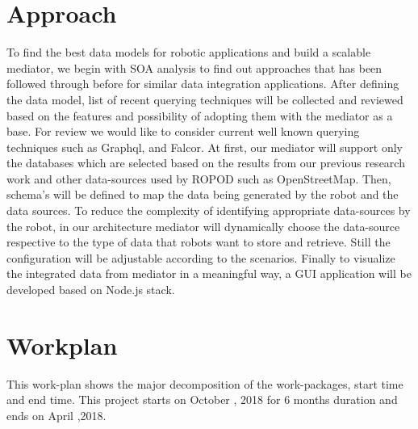 \documentclass[12pt]{article}
\begin{document}

\section{Approach}

To find the best data models for robotic applications and build a scalable mediator, we begin with SOA analysis to find out approaches that has been followed through before for similar data integration applications. After defining the data model, list of recent querying techniques will be collected and reviewed based on the features and possibility of adopting them with the mediator as a base. For review we would like to consider current well known querying techniques such as Graphql, and Falcor. At first, our mediator will support only the databases which are selected based on the results from our previous research work \cite{ravichandranworkbench} and other data-sources used by ROPOD such as OpenStreetMap. Then, schema's will be defined to map the data being generated by the robot and the data sources. To reduce the complexity of identifying appropriate data-sources by the robot, in our architecture mediator will dynamically choose the data-source respective to the type of data that robots want to store and retrieve. Still the configuration will be adjustable according to the scenarios. Finally to visualize the integrated data from mediator in a meaningful way, a GUI application will be developed based on Node.js stack.

\section{Workplan}
This work-plan shows the major decomposition of the work-packages, start time and end time. This project starts on October , 2018 for 6 months duration and ends on April ,2018.
\newpage
\end{document}
